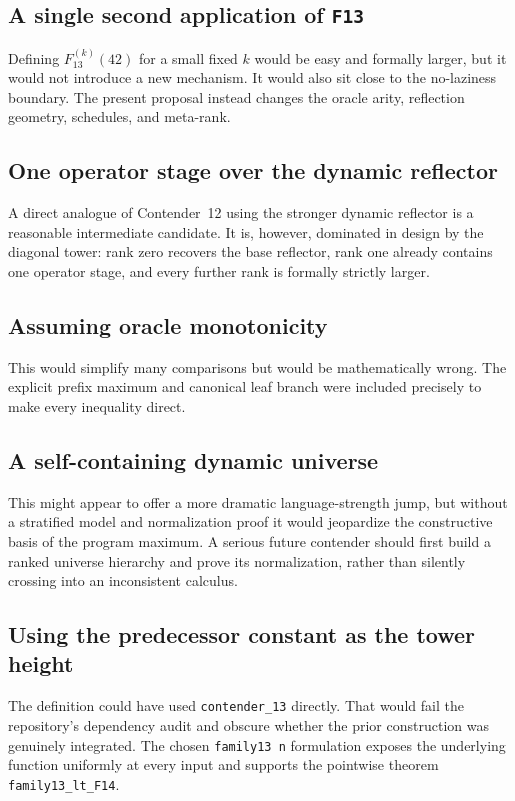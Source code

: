 \documentclass[11pt]{article}
\theoremstyle{definition}
\theoremstyle{remark}
\newcommand{\lean}[1]{\texttt{#1}}
\begin{document}
\subsection{A single second application of \lean{F13}}

Defining $F_{13}^{(k)}(42)$ for a small fixed $k$ would be easy and formally
larger, but it would not introduce a new mechanism.  It would also sit close to
the no-laziness boundary.  The present proposal instead changes the oracle
arity, reflection geometry, schedules, and meta-rank.

\subsection{One operator stage over the dynamic reflector}

A direct analogue of Contender~12 using the stronger dynamic reflector is a
reasonable intermediate candidate.  It is, however, dominated in design by
the diagonal tower: rank zero recovers the base reflector, rank one already
contains one operator stage, and every further rank is formally strictly
larger.

\subsection{Assuming oracle monotonicity}

This would simplify many comparisons but would be mathematically wrong.  The
explicit prefix maximum and canonical leaf branch were included precisely to
make every inequality direct.

\subsection{A self-containing dynamic universe}

This might appear to offer a more dramatic language-strength jump, but without
a stratified model and normalization proof it would jeopardize the constructive
basis of the program maximum.  A serious future contender should first build a
ranked universe hierarchy and prove its normalization, rather than silently
crossing into an inconsistent calculus.

\subsection{Using the predecessor constant as the tower height}

The definition could have used \lean{contender\_13} directly.  That would fail
the repository's dependency audit and obscure whether the prior construction
was genuinely integrated.  The chosen \lean{family13 n} formulation exposes
the underlying function uniformly at every input and supports the pointwise
theorem \lean{family13\_lt\_F14}.
\end{document}
